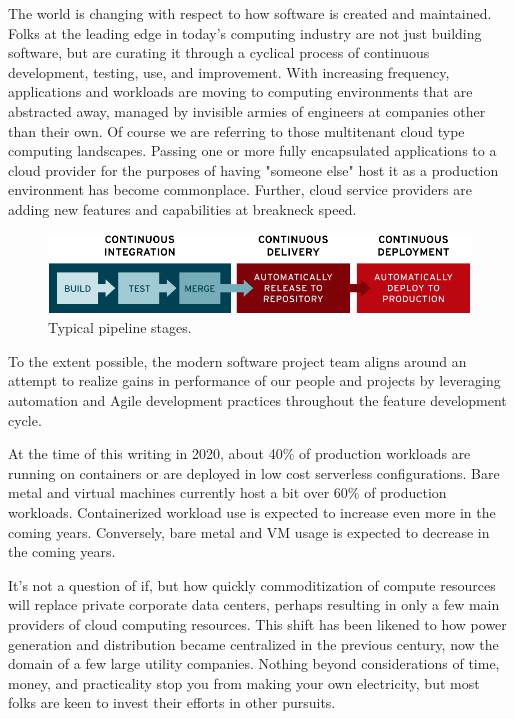 \justify
The world is changing with respect to how software is created and maintained.
Folks at the leading edge in today's computing industry are not just building
software, but are curating it through a cyclical process of continuous development,
testing, use, and improvement. With increasing frequency, applications and
workloads are moving to computing environments that are abstracted away, managed
by invisible armies of engineers at companies other than their own. Of course
we are referring to those multitenant cloud type computing landscapes. Passing
one or more fully encapsulated applications to a cloud provider for the purposes
of having "someone else" host it as a production environment has become
commonplace. Further, cloud service providers are adding new features and capabilities
at breakneck speed.

\begin{figure}[!htb]
	\centering
	\includegraphics[scale=0.35]{../images/ci-cd-flow-desktop_0.png}
	\caption{Typical pipeline stages.}
	\label{fig:stages}
\end{figure}

\justify
To the extent possible, the modern software project team aligns around an
attempt to realize gains in performance of our people and projects by
leveraging automation and Agile development practices throughout the
feature development cycle.

\justify
At the time of this writing in 2020, about 40\% of production workloads are
running on containers or are deployed in low cost serverless configurations.
Bare metal and virtual machines currently host a bit over 60\% of production
workloads. Containerized workload use is expected to increase even more in
the coming years. Conversely, bare metal and VM usage is expected to
decrease in the coming years.

\justify
It's not a question of if, but how quickly commoditization of compute resources
will replace private corporate data centers, perhaps resulting in only a
few main providers of cloud computing resources. This shift has been likened
to how power generation and distribution became centralized
in the previous century, now the domain of a few large utility companies.
Nothing beyond considerations of time, money, and practicality stop you
from making your own electricity, but most folks are keen to invest their
efforts in other pursuits.

